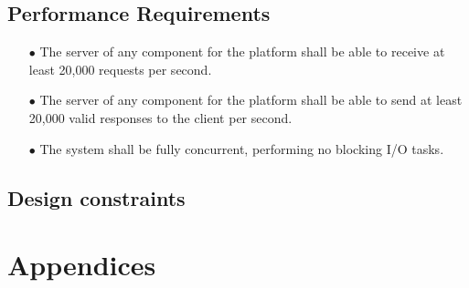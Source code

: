 \documentclass{scrreprt}
\begin{document}
\section{Performance Requirements}
\begin{enumerate}
	\item[$\bullet$] The server of any component for the platform shall be able to receive at least 20,000 requests per second.
	\item[$\bullet$] The server of any component for the platform shall be able to send at least 20,000 valid responses to the client per second.
	\item[$\bullet$] The system shall be fully concurrent, performing no blocking I/O tasks.
\end{enumerate}


\section{Design constraints}



\chapter{Appendices}
\end{document}
